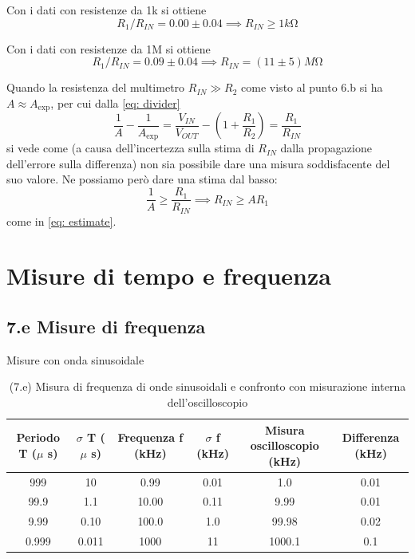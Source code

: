\documentclass[10pt,a4paper]{article}
\begin{document}
Con i dati con resistenze da 1k si ottiene
\begin{equation}\label{eq: estimate}
R_1/R_{IN} = 0.00  \pm  0.04   \implies  R_{IN} \geq 1 \si{k\ohm}
\end{equation}


Con i dati con resistenze da 1M si ottiene
\[ R_1/R_{IN} = 0.09  \pm  0.04   \implies  R_{IN} = (11 \pm  5) \si{M\ohm}
\]

Quando la resistenza del multimetro $R_{IN} \gg R_2$ come visto al punto
6.b si ha $A \approx A_{\exp}$, per cui dalla \eqref{eq: divider}
\[
\frac{1}{A} - \frac{1}{A_{\exp}} = \frac{V_{IN}}{V_{OUT}} -
(1 +  \frac{R_1}{R_2}) = \frac{R_1}{R_{IN}}
\]
si vede come (a causa dell'incertezza sulla stima di $R_{IN}$ dalla
propagazione dell'errore sulla differenza) non sia possibile dare una misura
soddisfacente del suo valore. Ne possiamo però dare una stima dal basso:
\[
\frac{1}{A} \geq \frac{R_1}{R_{IN}} \implies R_{IN} \geq A R_1
\]
come in \eqref{eq: estimate}.

\section{Misure di tempo e frequenza}

\subsection*{7.e Misure di frequenza}
Misure con onda sinusoidale
\begin{table}[h]
\centering
\begin{tabular}{|c|c|c|c|c|c|}
\hline 
Periodo T ($\mu$ s)& $\sigma$ T ($\mu$ s) &Frequenza f (kHz) & $\sigma$ f (kHz) &
Misura oscilloscopio (kHz) & Differenza (kHz)\\
\hline 
999 & 10 & 0.99 & 0.01 & 1.0 & 0.01 \\
99.9 & 1.1 & 10.00 & 0.11 & 9.99 & 0.01 \\
9.99 & 0.10 & 100.0 & 1.0 & 99.98 & 0.02 \\
0.999 & 0.011 & 1000 & 11 & 1000.1 & 0.1 \\
\hline 
\end{tabular} 
\caption{(7.e) Misura di frequenza di onde sinusoidali e confronto con
misurazione interna dell'oscilloscopio }
\end{table}
\end{document}
